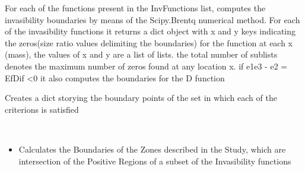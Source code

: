 \documentclass[letterpaper,10pt,english]{sphinxmanual}
\begin{document}
\begin{fulllineitems}
\begin{fulllineitems}
\end{fulllineitems}


\begin{fulllineitems}
\label{Analisis/InvasionAnalysis:InvasionAnalysis.InvBoundaries.setInvBoundaries}
For each of the functions present in the InvFunctions list, computes the invasibility boundaries by means of the
Scipy.Brentq numerical method.
For each of the invasibility functions it returns a dict object with x and y keys indicating the zeros(size ratio values delimiting
the boundaries) for the function at each x (mass), the values of x and y are a list of lists. the total number of sublists denotes the maximum
number of zeros found at any location x.
if e1e3 - e2 = EfDif \textless{}0 it also computes the boundaries for the D function

\end{fulllineitems}


\begin{fulllineitems}
\label{Analisis/InvasionAnalysis:InvasionAnalysis.InvBoundaries.setPositiveBoundaries}
Creates a dict storying the boundary points of the set in which each of the criterions is satisfied

\end{fulllineitems}


\begin{fulllineitems}
\label{Analisis/InvasionAnalysis:InvasionAnalysis.InvBoundaries.setUpGuess}
\end{fulllineitems}


\begin{fulllineitems}
\label{Analisis/InvasionAnalysis:InvasionAnalysis.InvBoundaries.setWidthsAndZones}~\begin{itemize}
\item {} 
Calculates the Boundaries of the Zones described in the Study, which are intersection of the Positive Regions of a subset of the Invasibility functions


\end{itemize}
\end{fulllineitems}
\end{fulllineitems}
\end{document}
